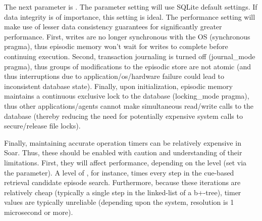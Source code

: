 The next parameter is .  
The  parameter setting will use SQLite default settings.  
If data integrity is of importance, this setting is ideal.  
The performance setting will make use of lesser data consistency guarantees for significantly greater performance.  
First, writes are no longer synchronous with the OS (synchronous pragma), thus episodic memory won't wait for writes to complete before continuing execution.  
Second, transaction journaling is turned off (journal\_mode pragma), thus groups of modifications to the episodic store are not atomic (and thus interruptions due to application/os/hardware failure could lead to inconsistent database state).  
Finally, upon initialization, episodic memory maintains a continuous exclusive lock to the database (locking\_mode pragma), thus other applications/agents cannot make simultaneous read/write calls to the database (thereby reducing the need for potentially expensive system calls to secure/release file locks).

Finally, maintaining accurate operation timers can be relatively expensive in Soar.  
Thus, these should be enabled with caution and understanding of their limitations.  
First, they will affect performance, depending on the level (set via the  parameter).  
A level of , for instance, times every step in the cue-based retrieval candidate episode search.  
Furthermore, because these iterations are relatively cheap (typically a single step in the linked-list of a b+-tree), timer values are typically unreliable (depending upon the system, resolution is 1 microsecond or more).

